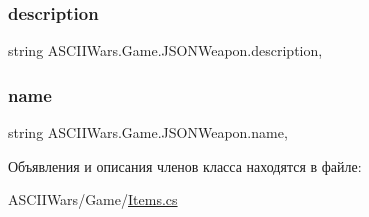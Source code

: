 \hypertarget{class_a_s_c_i_i_wars_1_1_game_1_1_j_s_o_n_weapon_af8f05b5ec58b19bf2a2d78fade7abd40}{}\label{class_a_s_c_i_i_wars_1_1_game_1_1_j_s_o_n_weapon_af8f05b5ec58b19bf2a2d78fade7abd40} 
\subsubsection{\texorpdfstring{description}{description}}
{\footnotesize\ttfamily string A\+S\+C\+I\+I\+Wars.\+Game.\+J\+S\+O\+N\+Weapon.\+description\hspace{0.3cm}{\ttfamily [get]}, {\ttfamily [set]}}

\hypertarget{class_a_s_c_i_i_wars_1_1_game_1_1_j_s_o_n_weapon_a66a5d6b4e9584f26f9b8a966ac98ddc0}{}\label{class_a_s_c_i_i_wars_1_1_game_1_1_j_s_o_n_weapon_a66a5d6b4e9584f26f9b8a966ac98ddc0} 
\subsubsection{\texorpdfstring{name}{name}}
{\footnotesize\ttfamily string A\+S\+C\+I\+I\+Wars.\+Game.\+J\+S\+O\+N\+Weapon.\+name\hspace{0.3cm}{\ttfamily [get]}, {\ttfamily [set]}}



Объявления и описания членов класса находятся в файле\+:\begin{DoxyCompactItemize}
\item 
A\+S\+C\+I\+I\+Wars/\+Game/\hyperlink{_items_8cs}{Items.\+cs}\end{DoxyCompactItemize}
